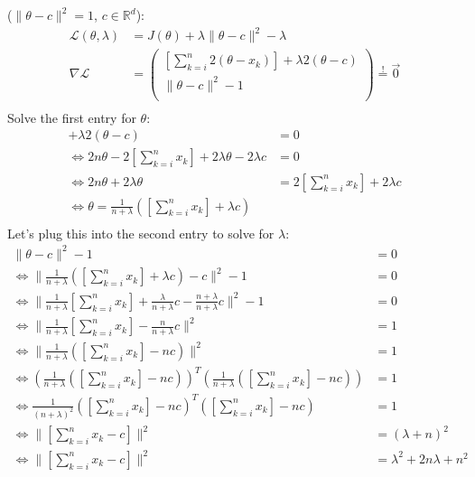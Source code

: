 \documentclass[10pt,a4paper]{article}
\begin{document}
\begin{enumerate}[(a)]
($\|\theta-c\|^2 = 1$, $c \in \mathbb{R}^d$):
\begin{align*}
    \mathcal{L}(\theta,\lambda) &= J(\theta) + \lambda \|\theta - c\|^2 - \lambda \\
    \nabla\mathcal{L} &= \left(
        \begin{array}{c}
            [\sum_{k = i}^{n} 2(\theta-x_k)] + \lambda 2(\theta - c)\\
            \|\theta - c\|^2 - 1\\
        \end{array}
    \right) \overset{!}{=} \vec{0} \\
\end{align*}
Solve the first entry for $\theta$:
\begin{align*}
    [\sum_{k = i}^{n} 2(\theta-x_k)] + \lambda 2(\theta - c) &= 0 \\
    \Leftrightarrow 2n\theta - 2 [\sum_{k = i}^{n}x_k] + 2\lambda \theta - 2\lambda c &= 0 \\
    \Leftrightarrow 2n\theta + 2\lambda \theta &= 2 [\sum_{k = i}^{n}x_k] + 2\lambda c \\
    \Leftrightarrow \theta = \frac{1}{n+\lambda} ([\sum_{k = i}^{n}x_k] + \lambda c)\\ 
\end{align*}
Let's plug this into the second entry to solve for $\lambda$:
\begin{align*}
    \|\theta - c\|^2 - 1 &= 0 \\
    \Leftrightarrow \| \frac{1}{n+\lambda} ([\sum_{k = i}^{n}x_k] + \lambda c) - c\|^2 - 1 &= 0\\
    \Leftrightarrow \| \frac{1}{n+\lambda} [\sum_{k = i}^{n}x_k] + \frac{\lambda}{n+\lambda} c - \frac{n+\lambda}{n+\lambda}c\|^2 - 1 &= 0\\
    \Leftrightarrow \| \frac{1}{n+\lambda} [\sum_{k = i}^{n}x_k] - \frac{n}{n+\lambda} c\|^2 &= 1\\
    \Leftrightarrow \| \frac{1}{n+\lambda} ([\sum_{k = i}^{n}x_k] - n c)\|^2 &= 1\\
    \Leftrightarrow  (\frac{1}{n+\lambda} ([\sum_{k = i}^{n}x_k] - n c))^T (\frac{1}{n+\lambda} ([\sum_{k = i}^{n}x_k] - n c)) &= 1\\
    \Leftrightarrow \frac{1}{(n+\lambda)^2}([\sum_{k = i}^{n}x_k] - n c)^T ([\sum_{k = i}^{n}x_k] - n c) &= 1\\
    \Leftrightarrow \|[\sum_{k = i}^{n}x_k - c]\|^2 &= (\lambda + n)^2\\
    \Leftrightarrow \|[\sum_{k = i}^{n}x_k - c]\|^2 &= \lambda^2 + 2n\lambda +n^2\\

\end{align*}
\end{enumerate}
\end{document}
